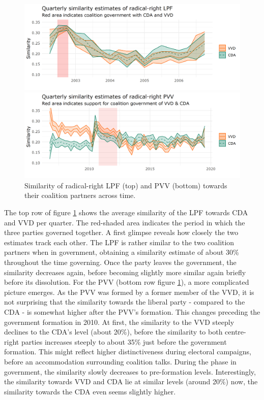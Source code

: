 \documentclass{article}
\begin{document}
\begin{figure}[ht!]
    \begin{minipage}{\textwidth}
    \includegraphics[width=\linewidth]{NL/vis/NL_lpf_sim.png}
    \end{minipage}
    \hfill
    \begin{minipage}{\textwidth}
    \includegraphics[width=\linewidth]{NL/vis/NL_pvv_sim.png}
    \end{minipage}
    \caption{Similarity of radical-right LPF (top) and PVV (bottom) towards their coalition partners across time.}
    \label{fig:nl_RR}
\end{figure}

The top row of figure \ref{fig:nl_RR} shows the average similarity of the LPF towards CDA and VVD per quarter. The red-shaded area indicates the period in which the three parties governed together. A first glimpse reveals how closely the two estimates track each other. The LPF is rather similar to the two coalition partners when in government, obtaining a similarity estimate of about 30\% throughout the time governing. Once the party leaves the government, the similarity decreases again, before becoming slightly more similar again briefly before its dissolution. For the PVV (bottom row figure \ref{fig:nl_RR}), a more complicated picture emerges. As the PVV was formed by a former member of the VVD, it is not surprising that the similarity towards the liberal party - compared to the CDA - is somewhat higher after the PVV's formation. This changes preceding the government formation in 2010. At first, the similarity to the VVD steeply declines to the CDA's level (about 20\%), before the similarity to both centre-right parties increases steeply to about 35\% just before the government formation. This might reflect higher distinctiveness during electoral campaigns, before an accommodation surrounding coalition talks. During the phase in government, the similarity slowly decreases to pre-formation levels. Interestingly, the similarity towards VVD and CDA lie at similar levels (around 20\%) now, the similarity towards the CDA even seems slightly higher. \par
\end{document}
